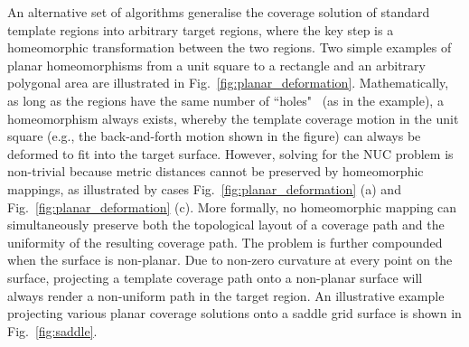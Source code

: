 \documentclass[lettersize,journal]{IEEEtran}
\begin{document}
An alternative set of algorithms generalise the coverage solution of standard template regions into arbitrary target regions, where the key step is a 
homeomorphic transformation between the two regions. 
Two simple examples of planar homeomorphisms from a unit square to a rectangle and an arbitrary polygonal area are illustrated in Fig.~\ref{fig:planar_deformation}. 
Mathematically, as long as the regions have the same number of ``holes"~\cite{Wu2019Energy} (as in the example), a homeomorphism always exists, whereby the template coverage motion in the unit square 
(e.g., the back-and-forth motion shown in the figure) can always be deformed to fit into the target surface. 
However, solving for the NUC problem is non-trivial because metric distances cannot be preserved by homeomorphic mappings, as illustrated by cases Fig.~\ref{fig:planar_deformation} (a) and Fig.~\ref{fig:planar_deformation} (c). 
More formally, no homeomorphic mapping can simultaneously preserve both the topological layout of a coverage path and the uniformity of the resulting coverage path. 
The problem is further compounded when the surface is non-planar. Due to non-zero curvature at every point on the surface, projecting a template coverage path 
onto a non-planar surface will always render a non-uniform path in the target region. 
An illustrative example projecting various planar coverage solutions onto a saddle grid surface is shown in Fig.~\ref{fig:saddle}. %
\end{document}
